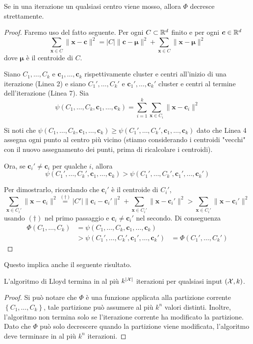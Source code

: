 \begin{lemma}
    Se in una iterazione un qualsiasi centro viene mosso, allora $\Phi$ decresce strettamente.
\end{lemma}
\begin{proof}
    Faremo uso del fatto seguente. Per ogni $C \subset \mathbb{R}^d$ finito e per ogni $\bm c \in \mathbb{R}^d$
    \[ \sum_{\bm x \in C} \|\bm x - \bm c\|^2 = |C|\|\bm c - \bm \mu \|^2 + \sum_{\bm x \in C} \|\bm x - \bm \mu \|^2  \tag*{($\dag$)}\]
    dove $\bm \mu$ è il centroide di $C$.

    Siano $C_1, \dots, C_k$ e $\bm c_1, \dots, \bm c_k$ rispettivamente cluster e centri all'inizio di una iterazione (Linea 2) e siano $C_1', \dots, C_k'$ e $\bm c_1', \dots, \bm c_k'$ cluster e centri al termine dell'iterazione (Linea 7). Sia
    $$ \psi \left(C_1, \dots, C_k, \bm c_1, \dots, \bm c_k \right) = \sum_{i = 1}^k \sum_{\bm x \in C_i} \|\bm x - \bm c_i \|^2 $$

    Si noti che $\psi \left(C_1, \dots, C_k, \bm c_1, \dots, \bm c_k \right) \geq \psi \left(C_1', \dots, C_k', \bm c_1, \dots, \bm c_k \right)$ dato che Linea 4 assegna ogni punto al centro più vicino (stiamo considerando i centroidi "vecchi" con il nuovo assegnamento dei punti, prima di ricalcolare i centroidi).

    Ora, se $\bm c_i' \neq \bm c_i$ per qualche $i$, allora
    $$ \psi \left(C_1', \dots, C_k', \bm c_1, \dots, \bm c_k \right) > \psi \left(C_1', \dots, C_k', \bm c_1', \dots, \bm c_k' \right) $$

    Per dimostrarlo, ricordando che $\bm c_i'$ è il centroide di $C_i'$,
    $$ \sum_{\bm x \in C_i'} \| \bm x - \bm c_i \|^2 \stackrel{(\dag)}{=} |C'| \|\bm c_i - \bm c_i'\|^2 + \sum_{\bm x \in C_i'} \| \bm x - \bm c_i' \|^2 > \sum_{\bm x \in C_i'} \| \bm x - \bm c_i' \|^2  $$
    usando $(\dag)$ nel primo passaggio e $\bm c_i \neq \bm c_i'$ nel secondo. Di conseguenza
    \begin{align*}
        \Phi \left(C_1, \dots, C_k\right)  & = \psi \left(C_1, \dots, C_k, \bm c_1, \dots, \bm c_k \right) & \\
        & > \psi \left(C_1', \dots, C_k', \bm c_1', \dots, \bm c_k' \right) & = \Phi \left(C_1', \dots, C_k' \right)
    \end{align*}
\end{proof}

Questo implica anche il seguente risultato.\\

\begin{theorem}
    L'algoritmo di Lloyd termina in al più $k^{|\mathcal{X}|}$ iterazioni per qualsiasi input $(\mathcal{X}, k)$.
\end{theorem}
\begin{proof}
    Si può notare che $\Phi$ è una funzione applicata alla partizione corrente $\left\{C_1, \dots, C_k\right\}$, tale partizione può assumere al più $k^n$ valori distinti. Inoltre, l'algoritmo non termina solo se l'iterazione corrente ha modificato la partizione. Dato che $\Phi$ può solo decrescere quando la partizione viene modificata, l'algoritmo deve terminare in al più $k^n$ iterazioni.
\end{proof}

